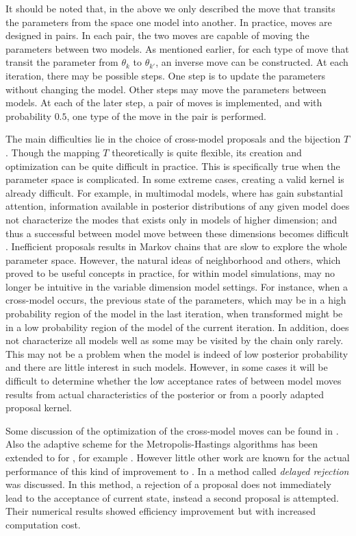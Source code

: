 It should be noted that, in the above we only described the move that transits
the parameters from the space one model into another. In practice, \rjmcmc
moves are designed in pairs. In each pair, the two moves are capable of moving
the parameters between two models. As mentioned earlier, for each type of move
that transit the parameter from $\theta_k$ to $\theta_{k'}$, an inverse move
can be constructed. At each iteration, there may be possible steps. One step
is to update the parameters without changing the model. Other steps may move
the parameters between models. At each of the later step, a pair of moves is
implemented, and with probability $0.5$, one type of the move in the pair is
performed.

The main difficulties lie in the choice of cross-model proposals and the
bijection $T$. Though the mapping $T$ theoretically is quite flexible, its
creation and optimization can be quite difficult in practice. This is
specifically true when the parameter space is complicated. In some extreme
cases, creating a valid kernel is already difficult. For example, in
multimodal models, where \rjmcmc has gain substantial attention, information
available in posterior distributions of any given model does not characterize
the modes that exists only in models of higher dimension; and thus a
successful between model move between these dimensions becomes difficult
\cite{Jasra:2007id}. Inefficient proposals results in Markov chains that are
slow to explore the whole parameter space. However, the natural ideas of
neighborhood and others, which proved to be useful concepts in practice, for
within model simulations, may no longer be intuitive in the variable dimension
model settings. For instance, when a cross-model occurs, the previous state of
the parameters, which may be in a high probability region of the model in the
last iteration, when transformed might be in a low probability region of the
model of the current iteration. In addition, \rjmcmc does not characterize all
models well as some may be visited by the chain only rarely. This may not be a
problem when the model is indeed of low posterior probability and there are
little interest in such models. However, in some cases it will be difficult to
determine whether the low acceptance rates of between model moves results from
actual characteristics of the posterior or from a poorly adapted proposal
kernel.

Some discussion of the optimization of the cross-model moves can be found in
\cite{Green:2009tr}. Also the adaptive scheme for the Metropolis-Hastings
algorithms has been extended to for \rjmcmc, for example \cite{Hastie:2005vi}.
However little other work are known for the actual performance of this kind of
improvement to \rjmcmc. In \cite{Green:2001tk} a method called \emph{delayed
  rejection} was discussed. In this method, a rejection of a proposal does not
immediately lead to the acceptance of current state, instead a second proposal
is attempted. Their numerical results showed efficiency improvement but with
increased computation cost.

